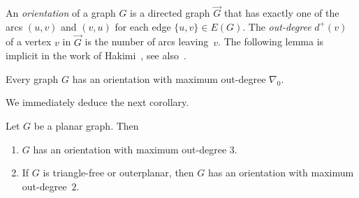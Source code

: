 


An \emph{orientation} of a graph $G$ is a directed graph $\vec{G}$ that
 has exactly one of the arcs $(u,v)$ and
$(v,u)$
for each edge $\{u,v\}\in E(G)$. The \emph{out-degree} $d^+(v)$ of a vertex $v$ in  $\vec{G}$
is the number of arcs leaving~$v$. The following
lemma is implicit in the work of Hakimi~\cite{sup_orie}, see \mbox{also~\cite[Proposition 3.3]{nevsetvril2012sparsity}.}

\begin{lemma}\label{lem:orientations}
  Every graph $G$ has an
  orientation with maximum out-degree $\nabla_0$.
\end{lemma}

We immediately deduce the next corollary.

\begin{corollary}\label{cor:planar-orientations}
  Let $G$ be a planar graph. Then
  \begin{enumerate}
    \item $G$ has an orientation with maximum out-degree $3$.%
    \item If $G$ is triangle-free or outerplanar, then
    $G$ has an orientation with maximum out-degree~$2$.
  \end{enumerate}
\end{corollary}

